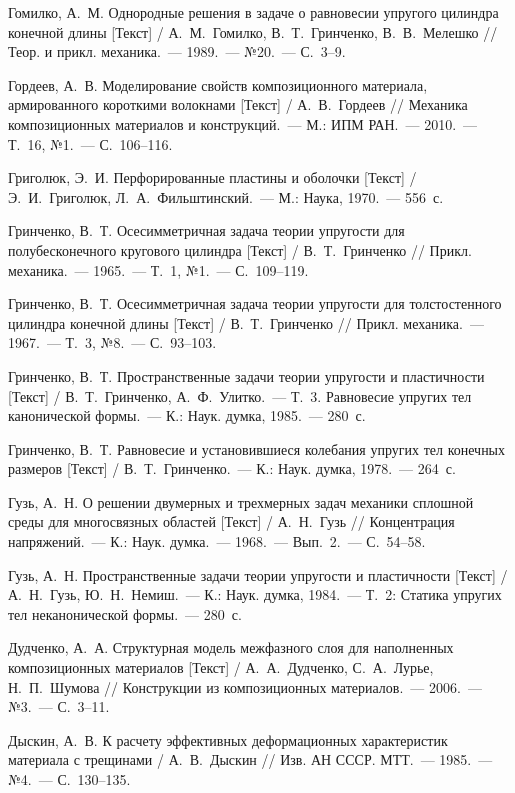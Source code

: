 \begin{biblist}{99}
Гомилко, А.~М. 
Однородные решения в задаче о равновесии упругого цилиндра конечной длины [Текст] 
/ А.~М.~Гомилко, В.~Т.~Гринченко, В.~В.~Мелешко 
// Теор. и прикл. механика.~--- 1989.~--- №20.~--- С.~3--9.

Гордеев, А.~В. 
Моделирование свойств композиционного материала, армированного короткими волокнами [Текст] 
/ А.~В.~Гордеев 
// Механика композиционных материалов и конструкций.~--- М.: ИПМ РАН.~--- 2010.~--- Т.~16, №1.~--- С.~106--116.

Григолюк, Э.~И. 
Перфорированные пластины и оболочки [Текст] 
/ Э.~И.~Григолюк, Л.~А.~Фильштинский.~--- М.: Наука, 1970.~--- 556~с.

Гринченко, В.~Т. 
Осесимметричная задача теории упругости для полубесконечного кругового цилиндра [Текст] 
/ В.~Т.~Гринченко 
// Прикл. механика.~--- 1965.~--- Т.~1, №1.~--- С.~109--119.

Гринченко, В.~Т. 
Осесимметричная задача теории упругости для толстостенного цилиндра конечной длины [Текст] 
/ В.~Т.~Гринченко 
// Прикл. механика.~--- 1967.~--- Т.~3, №8.~--- С.~93--103.

Гринченко, В.~Т. 
Пространственные задачи теории упругости и пластичности [Текст] 
/ В.~Т.~Гринченко, А.~Ф.~Улитко.~--- Т.~3. Равновесие упругих тел канонической формы.~--- К.: Наук. думка, 1985.~--- 280~с.

Гринченко, В.~Т. 
Равновесие и установившиеся колебания упругих тел конечных размеров [Текст] 
/ В.~Т.~Гринченко.~--- К.: Наук. думка, 1978.~--- 264~с.

Гузь, А.~Н. 
О решении двумерных и трехмерных задач механики сплошной среды для многосвязных областей [Текст] 
/ А.~Н.~Гузь 
// Концентрация напряжений.~--- К.: Наук. думка.~--- 1968.~--- Вып.~2.~--- С.~54--58.

Гузь, А.~Н. 
Пространственные задачи теории упругости и пластичности [Текст] 
/ А.~Н.~Гузь, Ю.~Н.~Немиш.~--- К.: Наук. думка, 1984.~--- Т.~2: Статика упругих тел неканонической формы.~--- 280~с.

Дудченко, А.~А. 
Структурная модель межфазного слоя для наполненных композиционных материалов [Текст] 
/ А.~А.~Дудченко, С.~А.~Лурье, Н.~П.~Шумова 
// Конструкции из композиционных материалов.~--- 2006.~--- №3.~--- С.~3--11.

Дыскин, А.~В. 
К расчету эффективных деформационных характеристик материала с трещинами  
/ А.~В.~Дыскин 
// Изв. АН СССР. МТТ.~--- 1985.~--- №4.~--- С.~130--135.


\end{biblist}
